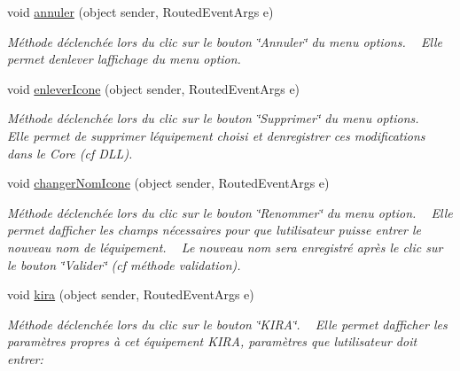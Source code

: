 \begin{DoxyCompactItemize}
void \hyperlink{class_my_domotik_1_1_gestion_equipements_a80c48ffd55ab9accecd891955789514e}{annuler} (object sender, Routed\+Event\+Args e)
\begin{DoxyCompactList}\small\item\em Méthode déclenchée lors du clic sur le bouton \char`\"{}\+Annuler\char`\"{} du menu options. ~\newline
Elle permet d\textquotesingle{}enlever l\textquotesingle{}affichage du menu option. \end{DoxyCompactList}\item 
void \hyperlink{class_my_domotik_1_1_gestion_equipements_a5e04306ecb4fe7feb824cc7274bb1e48}{enlever\+Icone} (object sender, Routed\+Event\+Args e)
\begin{DoxyCompactList}\small\item\em Méthode déclenchée lors du clic sur le bouton \char`\"{}\+Supprimer\char`\"{} du menu options. ~\newline
Elle permet de supprimer l\textquotesingle{}équipement choisi et d\textquotesingle{}enregistrer ces modifications dans le Core (cf D\+LL). \end{DoxyCompactList}\item 
void \hyperlink{class_my_domotik_1_1_gestion_equipements_a71e9eba4725658cd8a68b5e4c276b283}{changer\+Nom\+Icone} (object sender, Routed\+Event\+Args e)
\begin{DoxyCompactList}\small\item\em Méthode déclenchée lors du clic sur le bouton \char`\"{}\+Renommer\char`\"{} du menu option. ~\newline
Elle permet d\textquotesingle{}afficher les champs nécessaires pour que l\textquotesingle{}utilisateur puisse entrer le nouveau nom de l\textquotesingle{}équipement. ~\newline
Le nouveau nom sera enregistré après le clic sur le bouton \char`\"{}\+Valider\char`\"{} (cf méthode validation). \end{DoxyCompactList}\item 
void \hyperlink{class_my_domotik_1_1_gestion_equipements_a9eb4a42272eda6f4c73d322a9cc86770}{kira} (object sender, Routed\+Event\+Args e)
\begin{DoxyCompactList}\small\item\em Méthode déclenchée lors du clic sur le bouton \char`\"{}\+K\+I\+R\+A\char`\"{}. ~\newline
Elle permet d\textquotesingle{}afficher les paramètres propres à cet équipement K\+I\+RA, paramètres que l\textquotesingle{}utilisateur doit entrer\+: ~\newline

\end{DoxyCompactList}
\end{DoxyCompactItemize}
